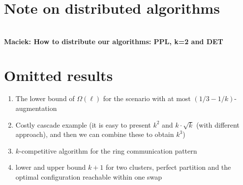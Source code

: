 \documentclass[manuscript,screen=true, review, anonymous]{acmart}
\newcommand\maciek[1]{\color{brown}\textbf{\\ Maciek: #1}\color{black}}
\begin{document}
\section{Note on distributed algorithms}

\maciek{How to distribute our algorithms: PPL, k=2 and DET}


  

\pagebreak
\appendix


\section{Omitted results}

\begin{enumerate}
  		 \item The lower bound of $\Omega(\ell)$ for the scenario with at most $(1/3-1/k)$-augmentation
  
  		 \item Costly cascade example (it is easy to present $k^2$ and $k\cdot \sqrt{k}$ (with different approach), and then we can combine these to obtain $k^3$)
  
  		 \item $k$-competitive algorithm for the ring communication pattern
       
       \item lower and upper bound $k+1$ for two clusters, perfect partition and the optimal configuration reachable within one swap
  
  \end{enumerate}
\end{document}
